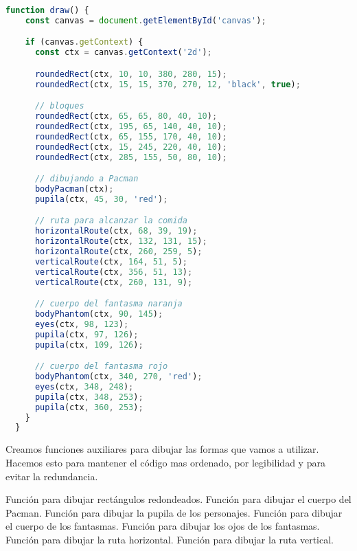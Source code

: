 \begin{lstlisting}[language=TypeScript, style=mystyle]
  function draw() {
    const canvas = document.getElementById('canvas');

    if (canvas.getContext) {
      const ctx = canvas.getContext('2d');

      roundedRect(ctx, 10, 10, 380, 280, 15);
      roundedRect(ctx, 15, 15, 370, 270, 12, 'black', true);

      // bloques
      roundedRect(ctx, 65, 65, 80, 40, 10);
      roundedRect(ctx, 195, 65, 140, 40, 10);
      roundedRect(ctx, 65, 155, 170, 40, 10);
      roundedRect(ctx, 15, 245, 220, 40, 10);
      roundedRect(ctx, 285, 155, 50, 80, 10);

      // dibujando a Pacman
      bodyPacman(ctx);
      pupila(ctx, 45, 30, 'red');

      // ruta para alcanzar la comida
      horizontalRoute(ctx, 68, 39, 19);
      horizontalRoute(ctx, 132, 131, 15);
      horizontalRoute(ctx, 260, 259, 5);
      verticalRoute(ctx, 164, 51, 5);
      verticalRoute(ctx, 356, 51, 13);
      verticalRoute(ctx, 260, 131, 9);

      // cuerpo del fantasma naranja
      bodyPhantom(ctx, 90, 145);
      eyes(ctx, 98, 123);
      pupila(ctx, 97, 126);
      pupila(ctx, 109, 126);

      // cuerpo del fantasma rojo
      bodyPhantom(ctx, 340, 270, 'red');
      eyes(ctx, 348, 248);
      pupila(ctx, 348, 253);
      pupila(ctx, 360, 253);
    }
  }
\end{lstlisting}

Creamos funciones auxiliares para dibujar las formas que vamos a utilizar. Hacemos esto para mantener el código mas ordenado, por legibilidad y para evitar la redundancia.

\begin{description}
	 Función para dibujar rectángulos redondeados.
	 Función para dibujar el cuerpo del Pacman.
	 Función para dibujar la pupila de los personajes.
	 Función para dibujar el cuerpo de los fantasmas.
	 Función para dibujar los ojos de los fantasmas.
	 Función para dibujar la ruta horizontal.
	 Función para dibujar la ruta vertical.
\end{description}
\vspace{0.5cm} %

